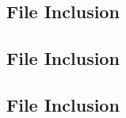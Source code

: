 \documentclass[11pt]{article}
\newcommand{\Verilog}[2][]{%
	
}
\begin{document}
    \subsection*{File Inclusion}
    \Verilog[caption=anode decoder Test Benches Verilog code,label=code:file_ex]{anode_decoder_test.sv}


    \subsection*{File Inclusion}
    \Verilog[caption=sseg4 Verilog code,label=code:file_ex]{sseg4.sv}

    \subsection*{File Inclusion}
    \Verilog[caption=sseg4 manual Verilog code,label=code:file_ex]{sseg4_manual.sv}
\end{document}

